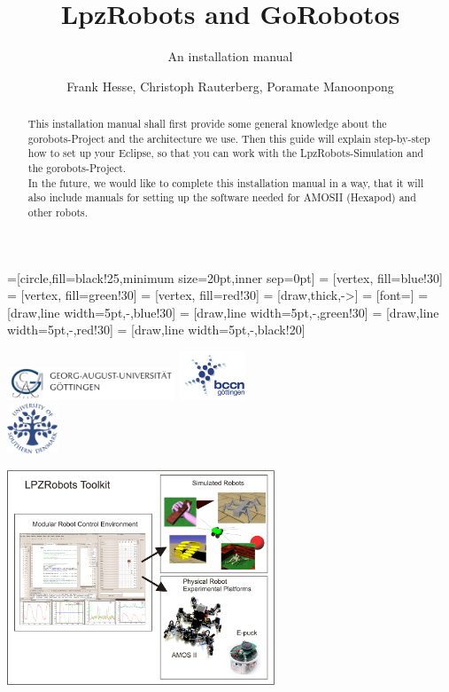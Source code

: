 \documentclass[a4paper,10pt]{scrartcl}
\title{LpzRobots and GoRobotos}
\subtitle{An installation manual}
\author{Frank Hesse, Christoph Rauterberg, Poramate Manoonpong}
\begin{document}
 =[circle,fill=black!25,minimum size=20pt,inner sep=0pt]
  = [vertex, fill=blue!30]
  = [vertex, fill=green!30]
  = [vertex, fill=red!30]
  = [draw,thick,->]
  = [font=\small]
  = [draw,line width=5pt,-,blue!30]
  = [draw,line width=5pt,-,green!30]
  = [draw,line width=5pt,-,red!30]
  = [draw,line width=5pt,-,black!20]
\renewcommand{\emph}[1]{\textcolor{blue}{#1}}
\newcommand{\remph}[1]{\textcolor{red}{#1}}


\maketitle

\begin{center}
\includegraphics[width=5cm]{./pics/LogoUni.png} %
 \includegraphics[width=2cm]{./pics/LogoBCCN.png}\\ %
 \includegraphics[width=1.5cm]{./pics/SDUlogo.png} %
\end{center}

\begin{abstract}
This installation manual shall first provide some general knowledge about the gorobots-Project and
the architecture we use. Then this guide will explain step-by-step how to set up
your Eclipse, so that you can work with the LpzRobots-Simulation and the gorobots-Project. \\
In the future, we would like to complete this installation manual in a way, that it will also include manuals for setting up the software needed for AMOSII (Hexapod) and other robots.
\end{abstract}

\begin{center}
\includegraphics[width=8cm]{./pics/AIdiagram.png}
\end{center}
\end{document}
